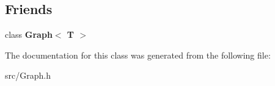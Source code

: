 \subsection*{Friends}
\begin{DoxyCompactItemize}
\item 
\hypertarget{class_vertex_aefa9b76cd57411c5354e5620dc2d84dd}{}\label{class_vertex_aefa9b76cd57411c5354e5620dc2d84dd} 
class {\bfseries Graph$<$ T $>$}
\end{DoxyCompactItemize}


The documentation for this class was generated from the following file\+:\begin{DoxyCompactItemize}
\item 
src/Graph.\+h\end{DoxyCompactItemize}
